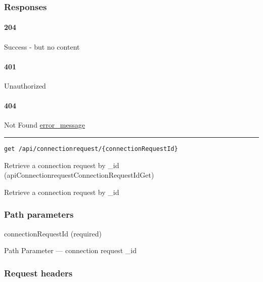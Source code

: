 \hypertarget{responses-2}{%
\subsubsection{Responses}\label{responses-2}}

\hypertarget{section-6}{%
\paragraph{204}\label{section-6}}

Success - but no content \protect\hyperlink{}{}

\hypertarget{section-7}{%
\paragraph{401}\label{section-7}}

Unauthorized \protect\hyperlink{}{}

\hypertarget{section-8}{%
\paragraph{404}\label{section-8}}

Not Found \protect\hyperlink{error_message}{error\_message}

\begin{center}\rule{0.5\linewidth}{\linethickness}\end{center}

\protect\hypertarget{apiConnectionrequestConnectionRequestIdGet}{}{}

\begin{verbatim}
get /api/connectionrequest/{connectionRequestId}
\end{verbatim}

Retrieve a connection request by \_id
({apiConnectionrequestConnectionRequestIdGet})

Retrieve a connection request by \_id

\hypertarget{path-parameters-3}{%
\subsubsection{Path parameters}\label{path-parameters-3}}

connectionRequestId (required)

{Path Parameter} --- connection request \_id

\hypertarget{request-headers-3}{%
\subsubsection{Request headers}\label{request-headers-3}}

